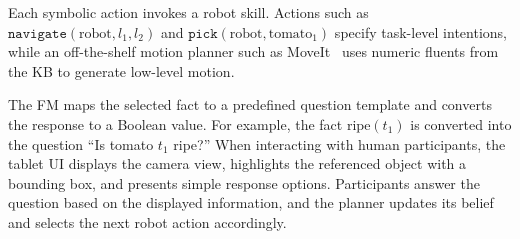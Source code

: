 
\label{method:action_execution}
Each symbolic action invokes a robot skill. Actions such as $\texttt{navigate}(\text{robot},l_1,l_2)$ and $\texttt{pick}(\text{robot},\text{tomato}_1)$ specify task-level intentions, while an off-the-shelf motion planner such as MoveIt~\citep{chitta2012moveit} uses numeric fluents from the KB to generate low-level motion.

\label{method:FM}
The FM maps the selected fact to a predefined question template and converts the response to a Boolean value. For example, the fact $\mathrm{ripe}(t_1)$ is converted into the question ``Is tomato $t_1$ ripe?'' When interacting with human participants, the tablet UI displays the camera view, highlights the referenced object with a bounding box, and presents simple response options. Participants answer the question based on the displayed information, and the planner updates its belief and selects the next robot action accordingly.